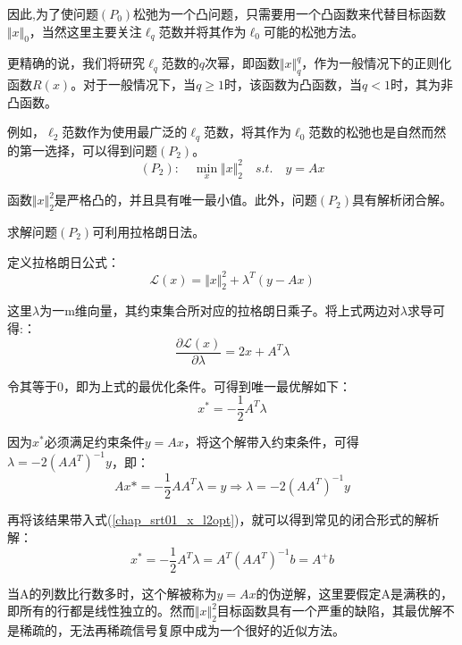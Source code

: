 因此,为了使问题$ (P_0) $松弛为一个凸问题，只需要用一个凸函数来代替目标函数$\Vert x \Vert_0  $，当然这里主要关注$ \ell_q $范数并将其作为$ \ell_0 $可能的松弛方法。

更精确的说，我们将研究$ \ell_q $范数的$ q $次幂，即函数$ \Vert x\Vert_q^q $，作为一般情况下的正则化函数$ R(x) $。对于一般情况下，当$ q\geq 1 $时，该函数为凸函数，当$ q<1 $时，其为非凸函数。


{\heiti 例如，$ \ell_2 $范数作为使用最广泛的$ \ell_q $范数，将其作为$ \ell_0 $范数的松弛也是自然而然的第一选择，可以得到问题$ (P_2) $}。
\begin{equation}\label{key}
(P_2):\quad  \min_{x} \Vert x \Vert_2^2 \quad s.t. \quad y =Ax
\end{equation}

函数$ \Vert x\Vert_2^2 $是严格凸的，并且具有唯一最小值。此外，问题$ (P_2) $具有解析闭合解。

{\heiti 求解问题$ (P_2) $可利用拉格朗日法。}

定义拉格朗日公式：
\begin{equation}%
\mathcal{L}(x)= \Vert x \Vert_2^2 + \lambda^{T}(y-Ax)
\end{equation}

这里$\lambda$为一m维向量，其约束集合所对应的拉格朗日乘子。将上式两边对$ \lambda $求导可得:：
\begin{equation}\label{key}
\frac{\partial \mathcal{L}(x)}{\partial\lambda}= 2 x  +A^{T}\lambda 
\end{equation}

令其等于0，即为上式的最优化条件。可得到唯一最优解如下：
\begin{equation}\label{chap_srt01_x_l2opt}
x^*= -\frac{1}{2} A^T \lambda
\end{equation}

因为$ x^* $必须满足约束条件$y= Ax$，将这个解带入约束条件，可得$ \lambda = -2(AA^T)^{-1}y $，即：
\begin{equation}\label{key}
Ax* = -\frac{1}{2} A A^T \lambda = y  \Longrightarrow
\lambda = -2(AA^T)^{-1}y 
\end{equation}

再将该结果带入式(\ref{chap_srt01_x_l2opt})，就可以得到常见的闭合形式的解析解：
\begin{equation}\label{key}
x^* = -\frac{1}{2} A^T \lambda = A^{T}(AA^T)^{-1}b  = A^{+}b
\end{equation}

当A的列数比行数多时，这个解被称为$ y=Ax $的伪逆解，这里要假定A是满秩的，即所有的行都是线性独立的。然而$\Vert x\Vert_2^2  $目标函数具有一个严重的缺陷，其最优解不是稀疏的，无法再稀疏信号复原中成为一个很好的近似方法。

